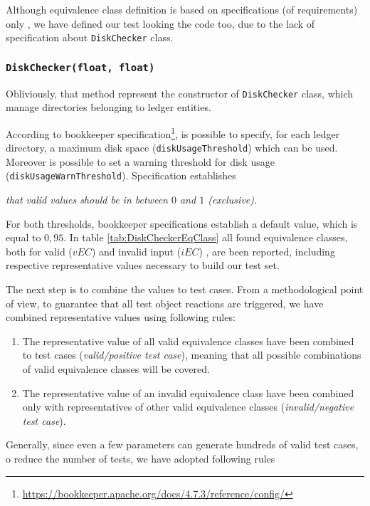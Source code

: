 \documentclass[conference]{IEEEtran}
\begin{document}
Although equivalence class definition is based on specifications (of requirements) only \cite{FoundationSoftwareTesting}, we have defined our test looking the code too, due to the lack of specification about \texttt{DiskChecker} class.

\subsubsection{\texttt{DiskChecker(float, float)}}

Obliviously, that method represent the constructor of \texttt{DiskChecker} class, which manage directories belonging to ledger entities. 

According to bookkeeper specification\footnote{\url{https://bookkeeper.apache.org/docs/4.7.3/reference/config/}}, is possible to specify, for each ledger directory, a maximum disk space (\texttt{diskUsageThreshold}) which can be used. Moreover is possible to set a warning threshold for disk usage (\texttt{diskUsageWarnThreshold}). Specification establishes 

\vspace{5pt}
\textit{that valid values should be in between $0$ and $1$ (exclusive).}
\vspace{5pt}

For both thresholds, bookkeeper specifications establish a default value, which is equal to $0,95$. In table \ref{tab:DiskCheckerEqClass} all found equivalence classes, both for valid ($vEC$) and invalid input ($iEC$) , are been reported, including respective representative values necessary to build our test set. 

The next step is to combine the values to test cases. From a methodological point of view, to guarantee that all test object reactions are triggered, we have combined representative values using following rules:
\begin{enumerate}
\item The representative value of all valid equivalence classes have been combined to test cases (\textit{valid/positive test case}), meaning that all possible combinations of valid equivalence classes will be covered. 
\item The representative value of an invalid equivalence class have been combined only with representatives of other valid equivalence classes (\textit{invalid/negative test case}).
\end{enumerate}

Generally, since even a few parameters can generate hundreds of valid test cases, o reduce the number of tests, we have adopted following rules
\end{document}
